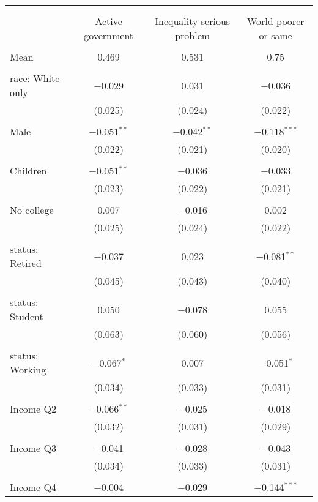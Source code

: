 
\begin{tabular}{@{\extracolsep{5pt}}lccc} 
\\[-1.8ex]\hline 
\hline \\[-1.8ex] 
\\[-1.8ex] & Active government & Inequality serious problem & World poorer or same \\ 
\hline \\[-1.8ex] 
 Mean & 0.469 & 0.531 & 0.75  \\ \hline \\[-1.8ex] race: White only & $-$0.029 & 0.031 & $-$0.036 \\ 
  & (0.025) & (0.024) & (0.022) \\ 
  & & & \\ 
 Male & $-$0.051$^{**}$ & $-$0.042$^{**}$ & $-$0.118$^{***}$ \\ 
  & (0.022) & (0.021) & (0.020) \\ 
  & & & \\ 
 Children & $-$0.051$^{**}$ & $-$0.036 & $-$0.033 \\ 
  & (0.023) & (0.022) & (0.021) \\ 
  & & & \\ 
 No college & 0.007 & $-$0.016 & 0.002 \\ 
  & (0.025) & (0.024) & (0.022) \\ 
  & & & \\ 
 status: Retired & $-$0.037 & 0.023 & $-$0.081$^{**}$ \\ 
  & (0.045) & (0.043) & (0.040) \\ 
  & & & \\ 
 status: Student & 0.050 & $-$0.078 & 0.055 \\ 
  & (0.063) & (0.060) & (0.056) \\ 
  & & & \\ 
 status: Working & $-$0.067$^{*}$ & 0.007 & $-$0.051$^{*}$ \\ 
  & (0.034) & (0.033) & (0.031) \\ 
  & & & \\ 
 Income Q2 & $-$0.066$^{**}$ & $-$0.025 & $-$0.018 \\ 
  & (0.032) & (0.031) & (0.029) \\ 
  & & & \\ 
 Income Q3 & $-$0.041 & $-$0.028 & $-$0.043 \\ 
  & (0.034) & (0.033) & (0.031) \\ 
  & & & \\ 
 Income Q4 & $-$0.004 & $-$0.029 & $-$0.144$^{***}$ \\ 

\end{tabular}
